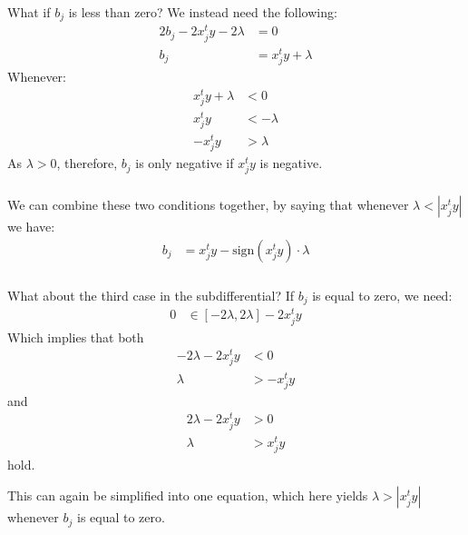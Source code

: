 \begin{frame}[fragile] \frametitle{}

What if $b_j$ is less than zero? We instead need the following:
\begin{align*}
2 b_j - 2 x_j^t y - 2 \lambda &= 0 \\
b_j &= x_j^t y + \lambda
\end{align*}
Whenever:
\begin{align*}
x_j^t y + \lambda &< 0 \\
x_j^t y &< -\lambda\\
-x_j^t y &> \lambda
\end{align*}
As $\lambda > 0$, therefore, $b_j$ is only negative if
$x_j^t y$ is negative.

\end{frame}

\begin{frame}[fragile] \frametitle{}

We can combine these two conditions together, by
saying that whenever $\lambda < |x_j^t y|$ we have:
\begin{align*}
b_j &= x_j^t y - \text{sign}(x_j^t y) \cdot \lambda
\end{align*}

\end{frame}

\begin{frame}[fragile] \frametitle{}

What about the third case in the subdifferential?
If $b_j$ is equal to zero, we need:
\begin{align*}
0 &\in [-2\lambda,2\lambda] - 2 x_j^t y
\end{align*}
Which implies that both
\begin{align*}
-2\lambda - 2 x_j^t y &< 0 \\
\lambda &> - x_j^t y
\end{align*}
\pause and
\begin{align*}
2 \lambda - 2 x_j^t y &> 0 \\
\lambda &> x_j^t y
\end{align*}
hold.

\pause This can again be simplified into one equation,
which here yields $\lambda > |x_j^t y|$ whenever $b_j$ is
equal to zero.

\end{frame}


